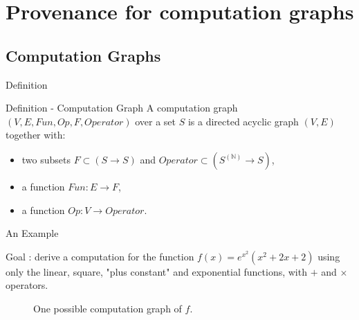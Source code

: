 \documentclass[11pt]{beamer}
\newcommand{\bb}[1]{\mathbb{#1}}
\begin{document}
\section{Provenance for computation graphs}
\subsection{Computation Graphs}

\begin{frame}{Definition}

\begin{block}{Definition - Computation Graph}
A computation graph $(V,E,Fun,Op,F,Operator)$ over a set $S$ is a directed acyclic graph $(V,E)$ together with:

\begin{itemize}

	\item two subsets $F \subset (S \to S)$ and $Operator \subset (S^{(\bb{N})} \to S)$,

	\item a function $Fun : E \to F$,
	
	\item a function $Op : V \to Operator$.
		
\end{itemize}
\end{block}

\end{frame}

\begin{frame}{An Example} %

	Goal : derive a computation for the function $f(x)=e^{x^2}(x^2 + 2x + 2)$ using only the linear, square, "plus constant" and exponential functions, with $+$ and $\times$ operators.

	\begin{figure}[!h]
	\centering
	\caption{One possible computation graph of $f$.}
	\label{fig:graphe_calc_ex}
	\end{figure}

\end{frame}
\end{document}
